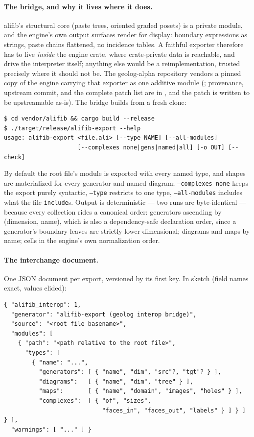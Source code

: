 \paragraph{The bridge, and why it lives where it does.}
alifib's structural core (paste trees, oriented graded posets) is a
private module, and the engine's own output surfaces render for
display: boundary expressions as strings, paste chains flattened, no
incidence tables. A faithful exporter therefore has to live
\emph{inside} the engine crate, where crate-private data is reachable,
and drive the interpreter itself; anything else would be a
reimplementation, trusted precisely where it should not be. The
geolog-alpha repository vendors a pinned copy of the engine carrying
that exporter as one additive module
(; provenance, upstream commit, and the complete
patch list are in , and the patch is
written to be upstreamable as-is). The bridge builds from a fresh
clone:

\begin{Verbatim}[fontsize=\small,frame=leftline,rulecolor=\color{accentmid},framesep=3mm,xleftmargin=3mm]
$ cd vendor/alifib && cargo build --release
$ ./target/release/alifib-export --help
usage: alifib-export <file.ali> [--type NAME] [--all-modules]
                     [--complexes none|gens|named|all] [-o OUT] [--check]
\end{Verbatim}

\noindent By default the root file's module is exported with every
named type, and shapes are materialized for every generator and named
diagram; \texttt{--complexes none} keeps the export purely syntactic,
\texttt{--type} restricts to one type, \texttt{--all-modules} includes
what the file \texttt{include}s. Output is deterministic --- two runs
are byte-identical --- because every collection rides a canonical
order: generators ascending by (dimension, name), which is also a
dependency-safe declaration order, since a generator's boundary leaves
are strictly lower-dimensional; diagrams and maps by name; cells in
the engine's own normalization order.

\paragraph{The interchange document.} One JSON document per export,
versioned by its first key. In sketch (field names exact, values
elided):

\begin{Verbatim}[fontsize=\small,frame=leftline,rulecolor=\color{accentmid},framesep=3mm,xleftmargin=3mm]
{ "alifib_interop": 1,
  "generator": "alifib-export (geolog interop bridge)",
  "source": "<root file basename>",
  "modules": [
    { "path": "<path relative to the root file>",
      "types": [
        { "name": "...",
          "generators": [ { "name", "dim", "src"?, "tgt"? } ],
          "diagrams":   [ { "name", "dim", "tree" } ],
          "maps":       [ { "name", "domain", "images", "holes" } ],
          "complexes":  [ { "of", "sizes",
                            "faces_in", "faces_out", "labels" } ] } ] } ],
  "warnings": [ "..." ] }
\end{Verbatim}

